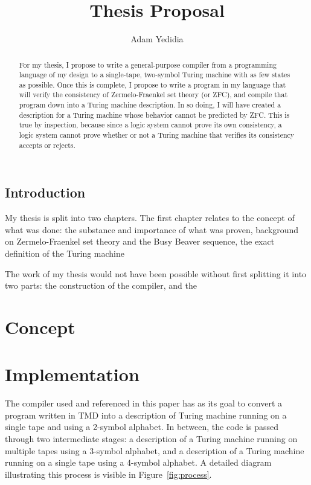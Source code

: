 \documentclass{report}
\begin{document}
\title{Thesis Proposal}
\author{Adam Yedidia}

\maketitle

\begin{abstract}

For my thesis, I propose to write a general-purpose compiler from a programming language of my design to a single-tape, two-symbol Turing machine with as few states as possible. Once this is complete, I propose to write a program in my language that will verify the consistency of Zermelo-Fraenkel set theory (or ZFC), and compile that program down into a Turing machine description. In so doing, I will have created a description for a Turing machine whose behavior cannot be predicted by ZFC. This is true by inspection, because since a logic system cannot prove its own consistency, a logic system cannot prove whether or not a Turing machine that verifies its consistency accepts or rejects.
\end{abstract}

\section{Introduction}
My thesis is split into two chapters. The first chapter relates to the concept of what was done: the substance and importance of what was proven, background on Zermelo-Fraenkel set theory and the Busy Beaver sequence, the exact definition of the Turing machine 

The work of my thesis would not have been possible without first splitting it into two parts: the construction of the compiler, and the 


\chapter{Concept}

\chapter{Implementation}

The compiler used and referenced in this paper has as its goal to convert a program written in TMD into a description of Turing machine running on a single tape and using a 2-symbol alphabet. In between, the code is passed through two intermediate stages: a description of a Turing machine running on multiple tapes using a 3-symbol alphabet, and a description of a Turing machine running on a single tape using a 4-symbol alphabet. A detailed diagram illustrating this process is visible in Figure~\ref{fig:process}. \\
\end{document}
